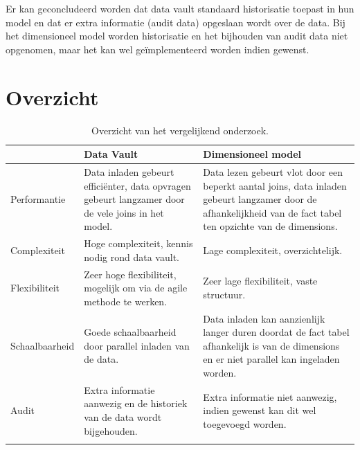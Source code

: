 Er kan geconcludeerd worden dat data vault standaard historisatie toepast in hun model en dat er extra informatie (audit data) opgeslaan wordt over de data. Bij het dimensioneel model worden historisatie en het bijhouden van audit data niet opgenomen, maar het kan wel geïmplementeerd worden indien gewenst.
\section{Overzicht}
\begin{center}
	\renewcommand{\arraystretch}{2}%
	\begin{longtable}{  l  p{}  p{} }
		\ & \textbf{Data Vault} & \textbf{Dimensioneel model} \\ \hline
		Performantie & Data inladen gebeurt efficiënter, data opvragen gebeurt langzamer door de vele joins in het model. & Data lezen gebeurt vlot door een beperkt aantal joins, data inladen gebeurt langzamer door de afhankelijkheid van de fact tabel ten opzichte van de dimensions. \\ \hline
		Complexiteit & Hoge complexiteit, kennis nodig rond data vault. & Lage complexiteit, overzichtelijk. \\ \hline
		Flexibiliteit & Zeer hoge flexibiliteit, mogelijk om via de agile methode te werken. & Zeer lage flexibiliteit, vaste structuur. \\ \hline
		Schaalbaarheid & Goede schaalbaarheid door parallel inladen van de data. & Data inladen kan aanzienlijk langer duren doordat de fact tabel afhankelijk is van de dimensions en er niet parallel kan ingeladen worden.  \\ \hline
		Audit & Extra informatie aanwezig en de historiek van de data wordt bijgehouden. & Extra informatie niet aanwezig, indien gewenst kan dit wel toegevoegd worden. \\
		\caption{Overzicht van het vergelijkend onderzoek.}
		\label{tab:overzicht}
	\end{longtable}
\end{center}